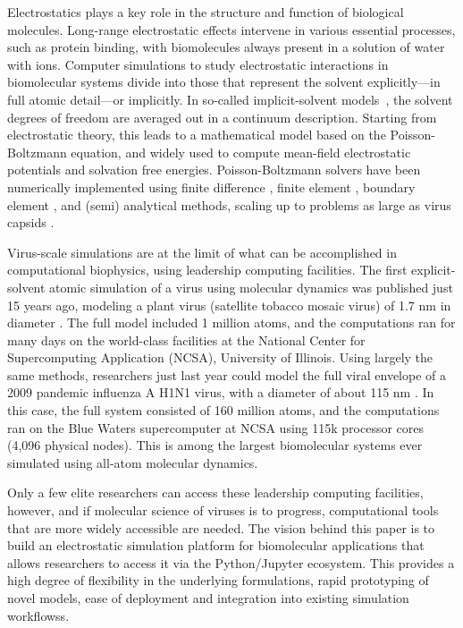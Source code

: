 Electrostatics plays a key role in the structure and function of biological molecules.
Long-range electrostatic effects intervene in various essential processes, such as protein binding, with biomolecules always present in a solution of water with ions.
Computer simulations to study electrostatic interactions in biomolecular systems divide into those that represent the solvent explicitly---in full atomic detail---or implicitly.
In so-called implicit-solvent models~\cite{RouxSimonson1999,DecherchiETal2015}, the solvent degrees of freedom are averaged out in a continuum description.
Starting from electrostatic theory, this leads to a mathematical model based on the Poisson-Boltzmann equation, and widely used to compute mean-field electrostatic potentials and solvation free energies.
Poisson-Boltzmann solvers have been numerically implemented using finite difference \cite{RocchiaAlexovHonig2001, BakerETal2001}, finite element \cite{BakerETal2001,BondETal2010,HolstETal2012}, boundary element \cite{AltmanBardhanWhiteTidor2009, GengKrasny2013, ZhangPengHuangPitsianisSunLu2015, CooperBardhanBarba2014}, and (semi) analytical \cite{LotanHead-Gordon2006,FelbergETal2017} methods, scaling up to problems as large as virus capsids \cite{ZhangETal2019,MartinezETal2019}.

Virus-scale simulations are at the limit of what can be accomplished in computational biophysics, using leadership computing facilities.
The first explicit-solvent atomic simulation of a virus using molecular dynamics was published just 15 years ago, modeling a plant virus (satellite tobacco mosaic virus) of 1.7 nm in diameter \cite{FreddolinoETal2006}.
The full model included 1 million atoms, and the computations ran for many days on the world-class facilities at the National Center for Supercomputing Application (NCSA), University of Illinois.
Using largely the same methods, researchers just last year could model the full viral envelope of a 2009 pandemic influenza A H1N1 virus, with a diameter of about 115 nm \cite{DurrantETal2020}.
In this case, the full system consisted of 160 million atoms, and the computations ran on the Blue Waters supercomputer at NCSA using 115k processor cores (4,096 physical nodes).
This is among the largest biomolecular systems ever simulated using all-atom molecular dynamics.

Only a few elite researchers can access these leadership computing facilities, however, and if molecular science of viruses is to progress, computational tools that are more widely accessible are needed.
The vision behind this paper is to build an electrostatic simulation platform for biomolecular applications that allows researchers to access it via the Python/Jupyter ecosystem. This provides a high degree of flexibility in the underlying formulations, rapid prototyping of novel models, ease of deployment and integration into existing simulation workflowss.

